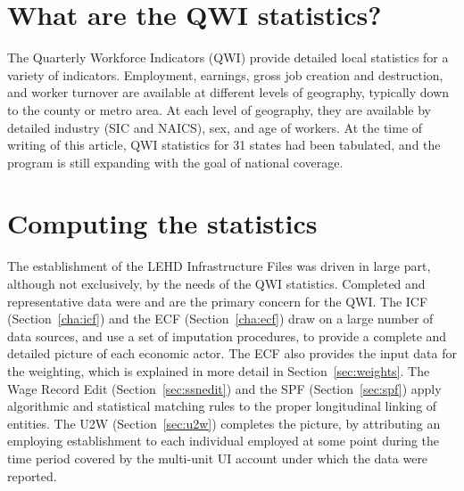                       
%
%


\section{What are the QWI statistics?}
\label{sec:qwi:what}

The Quarterly Workforce Indicators (QWI)%
 provide detailed local statistics for a variety of indicators.
Employment, earnings, gross job creation and destruction, and worker
turnover are available at different levels of geography, typically down to
the county or metro area. At each level of geography, they are available by
detailed industry (SIC and NAICS), sex, and age of workers. At the time of
writing of this article, QWI statistics for 31 states had been tabulated,
and the program is still expanding with the goal of national coverage.


\section{Computing the statistics}
\label{sec:qwi:compute}

The establishment of the LEHD Infrastructure Files was driven in large part,
although not exclusively, by the needs of the QWI statistics. Completed and
representative data were and are the primary concern for the QWI. The ICF
(Section~\ref{cha:icf}) and the ECF (Section~\ref{cha:ecf}) draw on a large
number of data sources, and use a set of imputation procedures, to provide a
complete and detailed picture of each economic actor. The ECF also provides
the input data for the weighting, which is explained in more detail in
Section~\ref{sec:weights}. The Wage Record Edit (Section~\ref{sec:ssnedit})
and the SPF (Section~\ref{sec:spf}) apply algorithmic and statistical
matching rules to the proper longitudinal linking of entities. The U2W
(Section~\ref{sec:u2w}) completes the picture, by attributing an employing
establishment to each individual employed at some point during the time
period covered by the multi-unit UI account under which the data were
reported.

